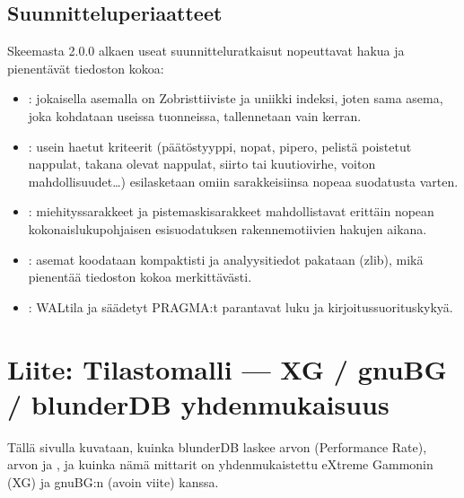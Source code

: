 \documentclass[letterpaper,10pt,finnish]{sphinxmanual}
\begin{document}
\subsection{Suunnitteluperiaatteet}
\label{\detokenize{annexe_db_scheme:principes-de-conception}}
\sphinxAtStartPar
Skeemasta 2.0.0 alkaen useat suunnitteluratkaisut nopeuttavat hakua ja pienentävät tiedoston kokoa:
\begin{itemize}
\item {} 
\sphinxAtStartPar
{}: jokaisella asemalla on Zobrist\sphinxhyphen{}tiiviste ja uniikki indeksi, joten sama asema, joka kohdataan useissa tuonneissa, tallennetaan vain kerran.

\item {} 
\sphinxAtStartPar
{}: usein haetut kriteerit (päätöstyyppi, nopat, pip\sphinxhyphen{}ero, pelistä poistetut nappulat, takana olevat nappulat, siirto\sphinxhyphen{} tai kuutiovirhe, voiton mahdollisuudet…) esilasketaan omiin sarakkeisiinsa nopeaa suodatusta varten.

\item {} 
\sphinxAtStartPar
{}: miehityssarakkeet ja pistemaskisarakkeet mahdollistavat erittäin nopean kokonaislukupohjaisen esisuodatuksen rakennemotiivien hakujen aikana.

\item {} 
\sphinxAtStartPar
{}: asemat koodataan kompaktisti ja analyysitiedot pakataan (zlib), mikä pienentää tiedoston kokoa merkittävästi.

\item {} 
\sphinxAtStartPar
{}: WAL\sphinxhyphen{}tila ja säädetyt PRAGMA:t parantavat luku\sphinxhyphen{} ja kirjoitussuorituskykyä.

\end{itemize}

\sphinxstepscope


\section{Liite: Tilastomalli — XG / gnuBG / blunderDB \sphinxhyphen{}yhdenmukaisuus}
\label{\detokenize{stats_parity:annexe-modele-de-statistiques-alignement-xg-gnubg-blunderdb}}\label{\detokenize{stats_parity:stats-parity}}\label{\detokenize{stats_parity::doc}}
\sphinxAtStartPar
Tällä sivulla kuvataan, kuinka blunderDB laskee \sphinxhyphen{}arvon (Performance Rate),  \sphinxhyphen{}arvon ja , ja kuinka nämä mittarit on yhdenmukaistettu eXtreme Gammonin (XG) ja gnuBG:n (avoin viite) kanssa.
\end{document}
